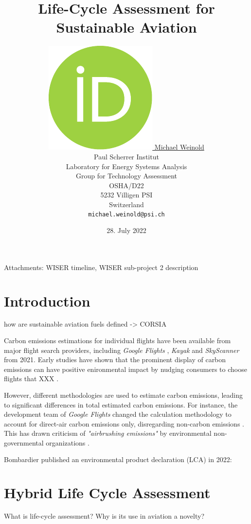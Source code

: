 \documentclass{article}
\title{Life-Cycle Assessment for Sustainable Aviation}
\author{
    \href{https://orcid.org/0000-0003-4859-2650}
    {\includegraphics[scale=0.06]{aux/figures/orcid.pdf}
    \hspace{1mm}
    Michael Weinold} \\
	Paul Scherrer Institut\\
	Laboratory for Energy Systems Analysis\\
	Group for Technology Assessment\\
	OSHA/D22\\
    5232 Villigen PSI \\
    Switzerland \\
	\texttt{michael.weinold@psi.ch} \\
}
\date{28. July 2022}
\begin{document}


\maketitle

\begin{abstract}
	\cite{becattini_role_2021}
\end{abstract}

Attachments:
WISER timeline, WISER sub-project 2 description

\section{Introduction}

\cite{prussi_corsia_2021}

how are sustainable aviation fuels defined -> CORSIA \cite{prussi_corsia_2021}

    Carbon emissions estimations for individual flights have been available from major flight search providers, including \textit{Google Flights} \cite{holden_google_2021}, \textit{Kayak} \cite{noauthor_kayak_2021} and \textit{SkyScanner} \cite{crosthwaite_how_2021} from 2021. Early studies have shown that the prominent display of carbon emissions can have positive enironmental impact by nudging consumers to choose flights that XXX \cite{amenta_adding_2020}\cite{sanguinetti_nudging_2022}.
    
    However, different methodologies are used to estimate carbon emissions, leading to significant differences in total estimated carbon emissions. For instance, the development team of \textit{Google Flights} changed the calculation methodology to account for direct-air carbon emissions only, disregarding non-carbon emissions \cite{ali_commit_2022}. This has drawn criticism of \textit{"airbrushing emissions"} by environmental non-governmental organizations \cite{hern_google_2022}\cite{rowlatt_google_2022}.
    
    Bombardier published an environmental product declaration (LCA) in 2022: \cite{noauthor_challenger_2022}

\section{Hybrid Life Cycle Assessment}

	What is life-cycle assessment?
	Why is its use in aviation a novelty?
	
\end{document}
